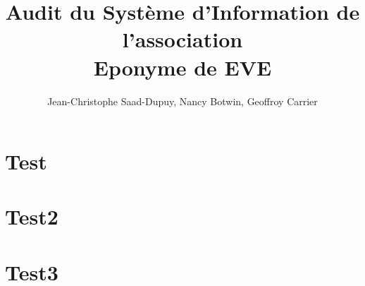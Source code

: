 \documentclass[a4paper,10pt]{article}
\title{Audit du Système d'Information de l'association \\ \huge{Eponyme de EVE}}
\author{Jean-Christophe Saad-Dupuy, Nancy Botwin, Geoffroy Carrier}
\begin{document}
\maketitle

\tableofcontents

\listoftables

\listoffigures

\section{Test}

\section{Test2}

\section{Test3}
\end{document}
